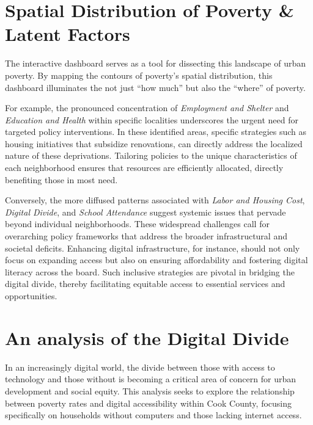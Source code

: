 \documentclass[
  letterpaper,
  DIV=11,
  numbers=noendperiod]{scrreprt}
\begin{document}
\chapter{Spatial Distribution of Poverty \& Latent
Factors}\label{spatial-distribution-of-poverty-latent-factors}

The interactive dashboard serves as a tool for dissecting this landscape
of urban poverty. By mapping the contours of poverty's spatial
distribution, this dashboard illuminates the not just ``how much'' but
also the ``where'' of poverty.

For example, the pronounced concentration of \emph{Employment and
Shelter} and \emph{Education and Health} within specific localities
underscores the urgent need for targeted policy interventions. In these
identified areas, specific strategies such as housing initiatives that
subsidize renovations, can directly address the localized nature of
these deprivations. Tailoring policies to the unique characteristics of
each neighborhood ensures that resources are efficiently allocated,
directly benefiting those in most need.

Conversely, the more diffused patterns associated with \emph{Labor and
Housing Cost}, \emph{Digital Divide}, and \emph{School Attendance}
suggest systemic issues that pervade beyond individual neighborhoods.
These widespread challenges call for overarching policy frameworks that
address the broader infrastructural and societal deficits. Enhancing
digital infrastructure, for instance, should not only focus on expanding
access but also on ensuring affordability and fostering digital literacy
across the board. Such inclusive strategies are pivotal in bridging the
digital divide, thereby facilitating equitable access to essential
services and opportunities.


\chapter{An analysis of the Digital
Divide}\label{an-analysis-of-the-digital-divide}

In an increasingly digital world, the divide between those with access
to technology and those without is becoming a critical area of concern
for urban development and social equity. This analysis seeks to explore
the relationship between poverty rates and digital accessibility within
Cook County, focusing specifically on households without computers and
those lacking internet access.
\end{document}
